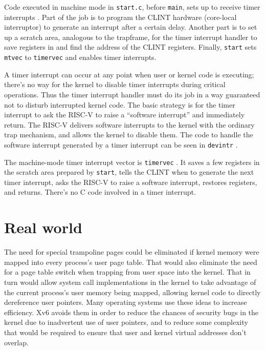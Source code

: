 
Code executed in machine mode in {\tt start.c}, before {\tt main},
sets up to receive timer interrupts
.
Part of the job is to program the CLINT hardware (core-local interruptor)
to generate an interrupt after a certain delay.
Another part is to set up a scratch area, analogous to the trapframe,
for the timer interrupt handler to save registers in and find
the address of the CLINT registers.
Finally, {\tt start} sets {\tt mtvec} to {\tt timervec} and
enables timer interrupts.

A timer interrupt can occur at any point when user or kernel code is
executing; there's no way for the kernel to disable timer interrupts
during critical operations. Thus the timer interrupt handler must do
its job in a way guaranteed not to disturb interrupted kernel code.
The basic strategy is for the timer interrupt to ask the RISC-V to
raise a ``software interrupt'' and immediately return. The RISC-V
delivers software interrupts to the kernel with the ordinary trap
mechanism, and allows the kernel to disable them. The code to
handle the software interrupt generated by a timer interrupt can be
seen in {\tt devintr} .

The machine-mode timer interrupt vector is {\tt timervec} 
.
It saves a few registers in the scratch area prepared by {\tt start},
tells the CLINT when to generate the next timer interrupt,
asks the RISC-V to raise a software interrupt,
restores registers, and returns.
There's no C code involved in a timer interrupt.

\section{Real world}

The need for special trampoline pages could be eliminated if kernel
memory were mapped into every process's user page table. That would
also eliminate the need for a page table switch when trapping from
user space into the kernel. That in turn would allow system call
implementations in the kernel to take advantage of the current
process's user memory being mapped, allowing kernel code to directly
dereference user pointers. Many operating systems use these ideas to
increase efficiency. Xv6 avoids them in order to reduce the chances of
security bugs in the kernel due to inadvertent use of user pointers,
and to reduce some complexity that would be required to ensure that
user and kernel virtual addresses don't overlap.

